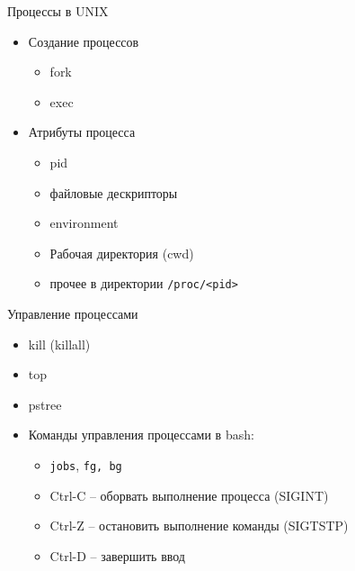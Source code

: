 \begin{frame}{Процессы в UNIX}
  \begin{itemize}
    \item Создание процессов
      \begin{itemize}
        \item fork
        \item exec
      \end{itemize}
    \item Атрибуты процесса
      \begin{itemize}
        \item pid 
        \item файловые дескрипторы
        \item environment
        \item Рабочая директория (cwd)
        \item прочее в директории {\tt /proc/<pid>}
      \end{itemize}
  \end{itemize}
\end{frame}

\begin{frame}{Управление процессами}
  \begin{itemize}
    \item kill (killall)
    \item top
    \item pstree
    \item Команды управления процессами в bash: 
      \begin{itemize}
        \item {\tt jobs}, {\tt fg, \tt bg}
        \item Ctrl-C -- оборвать выполнение процесса (SIGINT)
        \item Ctrl-Z -- остановить выполнение команды (SIGTSTP)
        \item Ctrl-D -- завершить ввод
      \end{itemize}
  \end{itemize}
\end{frame}


